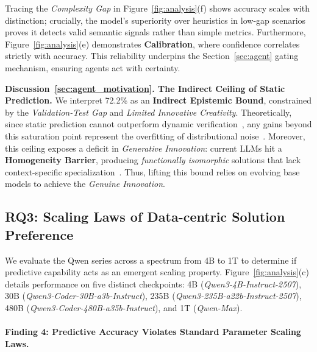 Tracing the \textit{Complexity Gap} in Figure~\ref{fig:analysis}(f) shows accuracy scales with distinction; crucially, the model's superiority over heuristics in low-gap scenarios proves it detects valid semantic signals rather than simple metrics.
Furthermore, Figure~\ref{fig:analysis}(e) demonstrates \textbf{Calibration}, where confidence correlates strictly with accuracy.
This reliability underpins the Section~\ref{sec:agent} gating mechanism, ensuring agents act with certainty.


\begin{insightbox}
    \textbf{{\textcolor{orange}{}} Discussion~\ref{sec:agent_motivation}. The Indirect Ceiling of Static Prediction.}
    We interpret 72.2\% as an \textbf{Indirect Epistemic Bound}, constrained by the \textit{Validation-Test Gap} and \textit{Limited Innovative Creativity}.
    Theoretically, since static prediction cannot outperform dynamic verification~\cite{rice1953classesofrecursively}, any gains beyond this saturation point represent the overfitting of distributional noise~\cite{dwork2015reusable}.
    Moreover, this ceiling exposes a deficit in \textit{Generative Innovation}: current LLMs hit a \textbf{Homogeneity Barrier}, producing \textit{functionally isomorphic} solutions that lack context-specific specialization~\cite{anil2024generativeaienhances}.
    Thus, lifting this bound relies on evolving base models to achieve the \textit{Genuine Innovation}.
\end{insightbox}

\subsection{RQ3: Scaling Laws of Data-centric Solution Preference}
\label{subsec:rq3_scaling}

We evaluate the Qwen series across a spectrum from 4B to 1T to determine if predictive capability acts as an emergent scaling property.
Figure~\ref{fig:analysis}(c) details performance on five distinct checkpoints: 4B (\textit{Qwen3-4B-Instruct-2507}), 30B (\textit{Qwen3-Coder-30B-a3b-Instruct}), 235B (\textit{Qwen3-235B-a22b-Instruct-2507}), 480B (\textit{Qwen3-Coder-480B-a35b-Instruct}), and 1T (\textit{Qwen-Max}).

\paragraph{Finding 4: Predictive Accuracy Violates Standard Parameter Scaling Laws.}

